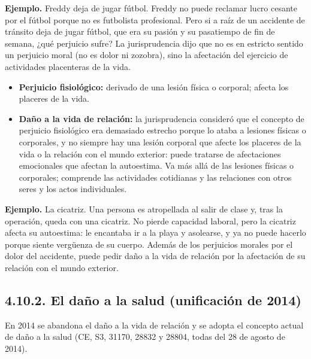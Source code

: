 \begin{ejemplo}
\textcolor[HTML]{4F6228}{\textbf{Ejemplo. }}Freddy deja de jugar fútbol. Freddy no puede reclamar lucro cesante por el fútbol porque no es futbolista profesional. Pero si a raíz de un accidente de tránsito deja de jugar fútbol, que era su pasión y su pasatiempo de fin de semana, ¿qué perjuicio sufre? La jurisprudencia dijo que no es en estricto sentido un perjuicio moral (no es dolor ni zozobra), sino la afectación del ejercicio de actividades placenteras de la vida.
\end{ejemplo}
\begin{itemize}
\item \textbf{Perjuicio fisiológico:} derivado de una lesión física o corporal; afecta los placeres de la vida.
\item \textbf{Daño a la vida de relación:} la jurisprudencia consideró que el concepto de perjuicio fisiológico era demasiado estrecho porque lo ataba a lesiones físicas o corporales, y no siempre hay una lesión corporal que afecte los placeres de la vida o la relación con el mundo exterior: puede tratarse de afectaciones emocionales que afectan la autoestima. Va más allá de las lesiones físicas o corporales; comprende las actividades cotidianas y las relaciones con otros seres y los actos individuales.
\end{itemize}
\begin{ejemplo}
\textcolor[HTML]{4F6228}{\textbf{Ejemplo. }}La cicatriz. Una persona es atropellada al salir de clase y, tras la operación, queda con una cicatriz. No pierde capacidad laboral, pero la cicatriz afecta su autoestima: le encantaba ir a la playa y asolearse, y ya no puede hacerlo porque siente vergüenza de su cuerpo. Además de los perjuicios morales por el dolor del accidente, puede pedir daño a la vida de relación por la afectación de su relación con el mundo exterior.
\end{ejemplo}
\subsection{4.10.2. El daño a la salud (unificación de 2014)}
En 2014 se abandona el daño a la vida de relación y se adopta el concepto actual de daño a la salud (CE, S3, 31170, 28832 y 28804, todas del 28 de agosto de 2014).

